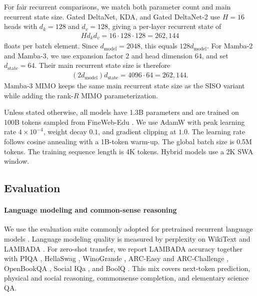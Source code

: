 For fair recurrent comparisons, we match both parameter count and main recurrent state size. Gated DeltaNet, KDA, and Gated DeltaNet-2 use $H=16$ heads with $d_k=128$ and $d_v=128$, giving a per-layer recurrent state of
\begin{align}
    H d_k d_v
    =
    16 \cdot 128 \cdot 128
    =
    262{,}144
\end{align}
floats per batch element. Since $d_{\mathrm{model}}=2048$, this equals $128d_{\mathrm{model}}$. For Mamba-2 and Mamba-3, we use expansion factor $2$ and head dimension $64$, and set $d_{\mathrm{state}}=64$. Their main recurrent state size is therefore
\begin{align}
    (2d_{\mathrm{model}})d_{\mathrm{state}}
    =
    4096 \cdot 64
    =
    262{,}144 .
\end{align}
Mamba-3 MIMO keeps the same main recurrent state size as the SISO variant while adding the rank-$R$ MIMO parameterization.

Unless stated otherwise, all models have 1.3B parameters and are trained on 100B tokens sampled from FineWeb-Edu \citep{penedo2024fineweb}. We use AdamW with peak learning rate $4\times10^{-4}$, weight decay $0.1$, and gradient clipping at $1.0$. The learning rate follows cosine annealing with a 1B-token warm-up. The global batch size is 0.5M tokens. The training sequence length is 4K tokens. Hybrid models use a 2K SWA window.

\subsection{Evaluation}

\paragraph{Language modeling and common-sense reasoning}
We use the evaluation suite commonly adopted for pretrained recurrent language models \citep{gu_mamba_2023}. Language modeling quality is measured by perplexity on WikiText \citep[Wiki.][]{merity2016pointer} and LAMBADA \citep[LMB.][]{paperno_lambada_2016}. For zero-shot transfer, we report LAMBADA accuracy together with PIQA \citep{bisk2020piqa}, HellaSwag \citep[Hella.][]{zellers2019hellaswag}, WinoGrande \citep[Wino.][]{sakaguchi2021winogrande}, ARC-Easy and ARC-Challenge \citep[ARC-e and ARC-c][]{arc-ce}, OpenBookQA \citep[OBQA][]{openbookqa}, Social IQa \citep[SIQA][]{sap2019social}, and BoolQ \citep{clark2019boolq}. This mix covers next-token prediction, physical and social reasoning, commonsense completion, and elementary science QA.

